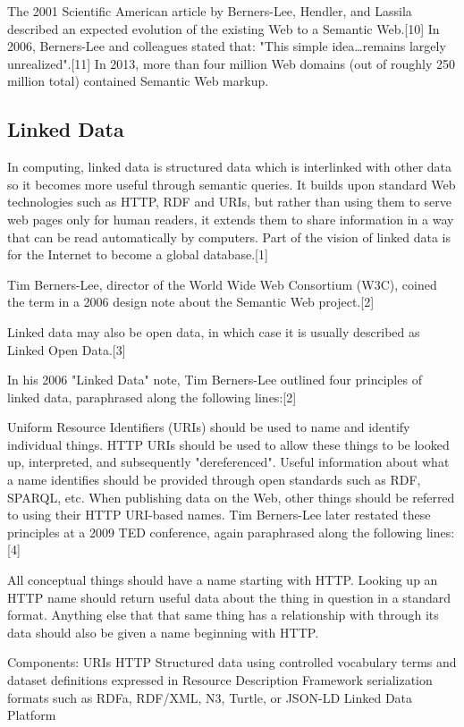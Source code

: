 The 2001 Scientific American article by Berners-Lee, Hendler, and Lassila described an expected evolution of the existing Web to a Semantic Web.[10] In 2006, Berners-Lee and colleagues stated that: "This simple idea…remains largely unrealized".[11] In 2013, more than four million Web domains (out of roughly 250 million total) contained Semantic Web markup.

\subsection*{Linked Data}
In computing, linked data is structured data which is interlinked with other data so it becomes more useful through semantic queries. It builds upon standard Web technologies such as HTTP, RDF and URIs, but rather than using them to serve web pages only for human readers, it extends them to share information in a way that can be read automatically by computers. Part of the vision of linked data is for the Internet to become a global database.[1]

Tim Berners-Lee, director of the World Wide Web Consortium (W3C), coined the term in a 2006 design note about the Semantic Web project.[2]

Linked data may also be open data, in which case it is usually described as Linked Open Data.[3]

In his 2006 "Linked Data" note, Tim Berners-Lee outlined four principles of linked data, paraphrased along the following lines:[2]

Uniform Resource Identifiers (URIs) should be used to name and identify individual things.
HTTP URIs should be used to allow these things to be looked up, interpreted, and subsequently "dereferenced".
Useful information about what a name identifies should be provided through open standards such as RDF, SPARQL, etc.
When publishing data on the Web, other things should be referred to using their HTTP URI-based names.
Tim Berners-Lee later restated these principles at a 2009 TED conference, again paraphrased along the following lines:[4]

All conceptual things should have a name starting with HTTP.
Looking up an HTTP name should return useful data about the thing in question in a standard format.
Anything else that that same thing has a relationship with through its data should also be given a name beginning with HTTP.

Components:
URIs
HTTP
Structured data using controlled vocabulary terms and dataset definitions expressed in Resource Description Framework serialization formats such as RDFa, RDF/XML, N3, Turtle, or JSON-LD
Linked Data Platform

